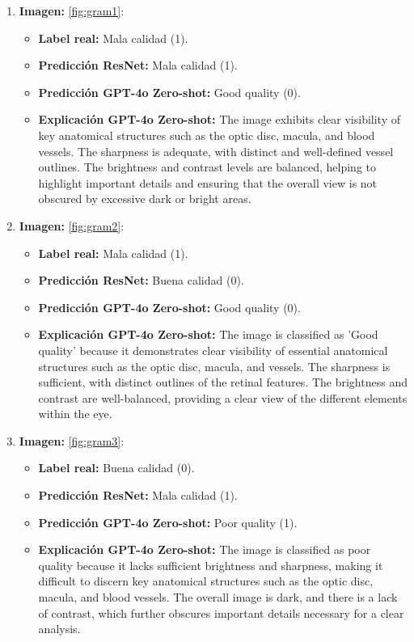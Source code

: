 \begin{enumerate}
	\item \textbf{Imagen:} \ref{fig:gram1}:
	\begin{itemize}
		\item \textbf{Label real:} Mala calidad (1).
		\item \textbf{Predicción ResNet:} Mala calidad (1).
		\item \textbf{Predicción GPT-4o Zero-shot:} Good quality (0).
		\item \textbf{Explicación GPT-4o Zero-shot:} The image exhibits clear visibility of key anatomical structures such as the optic disc, macula, and blood vessels. The sharpness is adequate, with distinct and well-defined vessel outlines. The brightness and contrast levels are balanced, helping to highlight important details and ensuring that the overall view is not obscured by excessive dark or bright areas.
	\end{itemize}
	\item \textbf{Imagen:} \ref{fig:gram2}:
		\begin{itemize}
		\item \textbf{Label real:} Mala calidad (1).
		\item \textbf{Predicción ResNet:} Buena calidad (0).
		\item \textbf{Predicción GPT-4o Zero-shot:} Good quality (0).
		\item \textbf{Explicación GPT-4o Zero-shot:} The image is classified as 'Good quality' because it demonstrates clear visibility of essential anatomical structures such as the optic disc, macula, and vessels. The sharpness is sufficient, with distinct outlines of the retinal features. The brightness and contrast are well-balanced, providing a clear view of the different elements within the eye.
	\end{itemize}
	\item \textbf{Imagen:} \ref{fig:gram3}:
	\begin{itemize}
		\item \textbf{Label real:} Buena calidad (0).
		\item \textbf{Predicción ResNet:} Mala calidad (1).
		\item \textbf{Predicción GPT-4o Zero-shot:} Poor quality (1).
		\item \textbf{Explicación GPT-4o Zero-shot:} The image is classified as poor quality because it lacks sufficient brightness and sharpness, making it difficult to discern key anatomical structures such as the optic disc, macula, and blood vessels. The overall image is dark, and there is a lack of contrast, which further obscures important details necessary for a clear analysis.
	\end{itemize}
\end{enumerate}

